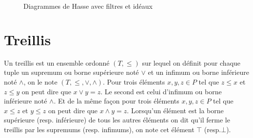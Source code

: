 \begin{figure}[H]
	\begin{minipage}{0.3\textwidth}
	\begin{center}
	\end{center}
	\end{minipage}
	\begin{minipage}{0.3\textwidth}
	\begin{center}
	\end{center}
	\end{minipage}
	\begin{minipage}{0.3\textwidth}
	\begin{center}
	\end{center}
	\end{minipage}
	\caption{Diagrammes de Hasse avec filtres et idéaux}
	\label{hasse_filtres_ideaux}
\end{figure}

\section{Treillis}

Un treillis est un ensemble ordonné $(T, \leq)$ sur lequel on définit pour chaque tuple un supremum ou borne supérieure noté $\vee$ et un infimum ou borne inférieure noté $\wedge$, on le note $(T, \leq, \vee, \wedge)$. Pour trois éléments $x, y, z \in P$ tel que $z \leq x$ et $z \leq y$ on peut dire que $x \vee y = z$. Le second est celui d'infimum ou borne inférieure noté $\wedge$. Et de la même façon pour trois éléments $x, y, z \in P$ tel que $x \leq z$ et $y \leq z$ on peut dire que $x \wedge y = z$. Lorsqu'un élément est la borne supérieure (resp. inférieure) de tous les autres éléments on dit qu'il ferme le treillis par les supremums (resp. infimums), on note cet élément $\top$ (resp.$\bot$).

